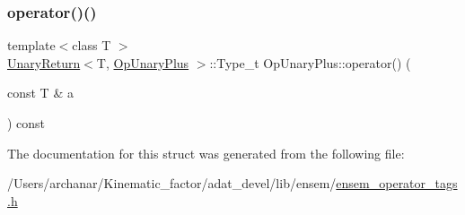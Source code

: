 \mbox{\label{structOpUnaryPlus_ad54a5d02fba52ca6cf35871d36aefab4}} 
\subsubsection{\texorpdfstring{operator()()}{operator()()}\hspace{0.1cm}{\footnotesize\ttfamily [2/2]}}
{\footnotesize\ttfamily template$<$class T $>$ \\
\mbox{\hyperlink{structUnaryReturn}{Unary\+Return}}$<$T, \mbox{\hyperlink{structOpUnaryPlus}{Op\+Unary\+Plus}} $>$\+::Type\+\_\+t Op\+Unary\+Plus\+::operator() (\begin{DoxyParamCaption}\item[{const T \&}]{a }\end{DoxyParamCaption}) const\hspace{0.3cm}{\ttfamily [inline]}}



The documentation for this struct was generated from the following file\+:\begin{DoxyCompactItemize}
\item 
/\+Users/archanar/\+Kinematic\+\_\+factor/adat\+\_\+devel/lib/ensem/\mbox{\hyperlink{lib_2ensem_2ensem__operator__tags_8h}{ensem\+\_\+operator\+\_\+tags.\+h}}\end{DoxyCompactItemize}
